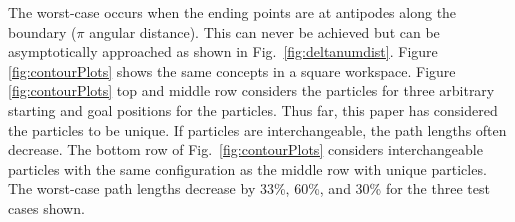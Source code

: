  The worst-case occurs when the ending points are at antipodes along the boundary ($\pi$ angular distance). This can never be achieved but can be asymptotically approached as shown in Fig.~\ref{fig:deltanumdist}. 
 Figure \ref{fig:contourPlots} shows the same concepts in a square workspace. Figure \ref{fig:contourPlots} top and middle row considers the particles for three arbitrary starting and goal positions for the particles. 
 Thus far, this paper has considered the particles to be unique. If particles are interchangeable, the path lengths often decrease. The bottom row of  Fig.~\ref{fig:contourPlots} considers interchangeable particles with the same configuration as the middle row with unique particles. The worst-case path lengths decrease by 33\%, 60\%, and 30\% for the three test cases shown. %
 
 










